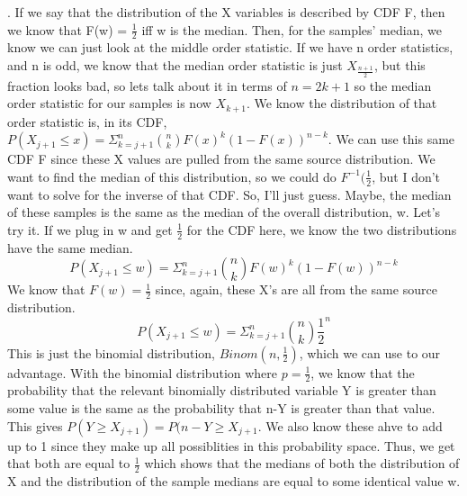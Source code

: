 \documentclass[11pt]{article}
\begin{document}
. 
	If we say that the distribution of the X variables is described by CDF F, then we know that F(w) = $\frac{1}{2}$ iff w is the median.  Then, for the samples' median, we know we can just look at the middle order statistic.  If we have n order statistics, and n is odd, we know that the median order statistic is just $X_{\frac{n+1}{2}}$, but this fraction looks bad, so lets talk about it in terms of $n=2k+1$ so the median order statistic for our samples is now $X_{k+1}$.  We know the distribution of that order statistic is, in its CDF, $P(X_{j+1} \le x) = \Sigma^n_{k=j+1}\binom{n}{k}F(x)^k(1-F(x))^{n-k}$. We can use this same CDF F since these X values are pulled from the same source distribution.  
	We want to find the median of this distribution, so we could do $F^{-1}(\frac{1}{2}$, but I don't want to solve for the inverse of that CDF.  So, I'll just guess.  Maybe, the median of these samples is the same as the median of the overall distribution, w.  Let's try it. If we plug in w and get $\frac{1}{2}$ for the CDF here, we know the two distributions have the same median. 
	$$P(X_{j+1} \le w) = \Sigma^n_{k=j+1}\binom{n}{k}F(w)^k(1-F(w))^{n-k}$$
	We know that $F(w)=\frac{1}{2}$ since, again, these X's are all from the same source distribution.  
	$$P(X_{j+1} \le w) = \Sigma^n_{k=j+1}\binom{n}{k}\frac{1}{2}^n$$
	This is just the binomial distribution, $Binom(n, \frac{1}{2})$, which we can use to our advantage.  With the binomial distribution where $p=\frac{1}{2}$, we know that the probability that the relevant binomially distributed variable Y is greater than some value is the same as the probability that n-Y is greater than that value.  This gives $P(Y\ge X_{j+1}) = P(n-Y \ge X_{j+1}$.  We also know these ahve to add up to 1 since they make up all possiblities in this probability space.  Thus, we get that both are equal to $\frac{1}{2}$ which shows that the medians of both the distribution of X and the distribution of the sample medians are equal to some identical value w.  
\end{document}

